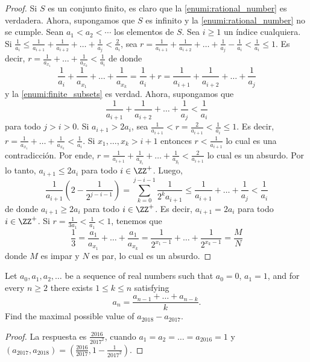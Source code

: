 \begin{proof}
	Si $S$ es un conjunto finito, es claro que la \ref{enumi:rational_number} es verdadera. Ahora, supongamos que $S$ es infinito y la \ref{enumi:rational_number} no se cumple. Sean $a_1<a_2<\cdots$ los elementos de $S$. Sea $i\ge 1$ un índice cualquiera. Si $\frac{1}{a_i}\le\frac{1}{a_{i+1}}+\frac{1}{a_{i+2}}+\dots+\frac{1}{a_j}<\frac{2}{a_i}$, sea $r=\frac{1}{a_{i+1}}+\frac{1}{a_{i+2}}+\dots+\frac{1}{a_j}-\frac{1}{a_i}<\frac{1}{a_i}\le 1$. Es decir, $r=\frac{1}{a_{x_1}}+\dots+\frac{1}{a_{x_k}}<\frac{1}{a_i}$ de donde
	\[\frac{1}{a_i}+\frac{1}{a_{x_1}}+\dots+\frac{1}{a_{x_k}}=\frac{1}{a_i}+r=\frac{1}{a_{i+1}}+\frac{1}{a_{i+2}}+\dots+\frac{1}{a_j}\]
	y la \ref{enumi:finite_subsets} es verdad. Ahora, supongamos que
	\[\frac{1}{a_{i+1}}+\frac{1}{a_{i+2}}+\dots+\frac{1}{a_j}<\frac{1}{a_i}\]
	para todo $j>i>0$. Si $a_{i+1}>2a_i$, sea $\frac{1}{a_{i+1}}<r=\frac{2}{a_{i+1}}<\frac{1}{a_i}\le 1$. Es decir, $r=\frac{1}{a_{x_1}}+\dots+\frac{1}{a_{x_k}}<\frac{1}{a_i}$. Si $x_1,\dots,x_k>i+1$ entonces $r<\frac{1}{a_{i+1}}$ lo cual es una contradicción. Por ende, $r=\frac{1}{a_{i+1}}+\frac{1}{a_{y_1}}+\dots+\frac{1}{a_{y_l}}<\frac{2}{a_{i+1}}$ lo cual es un absurdo. Por lo tanto, $a_{i+1}\le 2a_i$ para todo $i\in\ZZ^+$. Luego, \[\frac{1}{a_{i+1}}\left(2-\frac{1}{2^{j-i-1}}\right)=\sum_{k=0}^{j-i-1}\frac{1}{2^ka_{i+1}}\le\frac{1}{a_{i+1}}+\dots+\frac{1}{a_j}<\frac{1}{a_i}\]
	de donde $a_{i+1}\ge 2a_i$ para todo $i\in\ZZ^+$. Es decir, $a_{i+1}=2a_i$ para todo $i\in\ZZ^+$. Si $r=\frac{1}{3a_1}<\frac{1}{a_1}<1$, tenemos que
	\[\frac{1}{3}=\frac{a_1}{a_{x_1}}+\dots+\frac{a_1}{a_{x_k}}=\frac{1}{2^{x_1-1}}+\dots+\frac{1}{2^{x_k-1}}=\frac{M}{N}\]
	donde $M$ es impar y $N$ es par, lo cual es un absurdo.
\end{proof}

\begin{problem}
	Let $a_0,a_1,a_2,\dots$ be a sequence of real numbers such that $a_0=0$, $a_1=1$, and for every $n\ge 2$ there exists $1\le k\le n$ satisfying
	\[a_n=\frac{a_{n-1}+\dots+a_{n-k}}{k}.\]
	Find the maximal possible value of $a_{2018}-a_{2017}$.
\end{problem}

\begin{proof}
	La respuesta es $\frac{2016}{2017^2}$, cuando $a_1=a_2=\dots=a_{2016}=1$ y $(a_{2017},a_{2018})=\left(\frac{2016}{2017},1-\frac{1}{2017^2}\right)$.
\end{proof}
